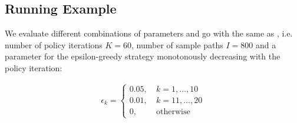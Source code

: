 \subsection{Running Example}


We evaluate different combinations of parameters and go with the same as \cite{Koch.2017}, i.e. number of policy iterations $K = 60$, number of sample paths $I = 800$ and a parameter for the epsilon-greedy strategy monotonously decreasing with the policy iteration:

\begin{align}
\epsilon_k = 
\begin{cases}
0.05, ~ &k=1, \dots, 10\\
0.01, ~ &k=11, \dots, 20\\
0, & \text{otherwise}
\end{cases}
\end{align}




%